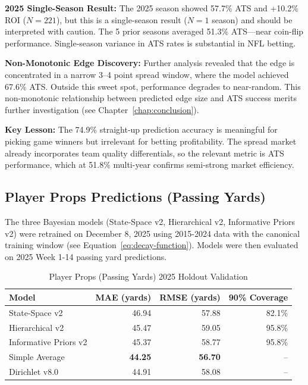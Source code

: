 \textbf{2025 Single-Season Result:} The 2025 season showed 57.7\% ATS and +10.2\% ROI ($N\!=\!221$), but this is a single-season result ($N\!=\!1$ season) and should be interpreted with caution. The 5 prior seasons averaged 51.3\% ATS---near coin-flip performance. Single-season variance in ATS rates is substantial in NFL betting.

\textbf{Non-Monotonic Edge Discovery:} Further analysis revealed that the edge is concentrated in a narrow 3--4 point spread window, where the model achieved 67.6\% ATS. Outside this sweet spot, performance degrades to near-random. This non-monotonic relationship between predicted edge size and ATS success merits further investigation (see Chapter~\ref{chap:conclusion}).

\textbf{Key Lesson:} The 74.9\% straight-up prediction accuracy is meaningful for picking game winners but irrelevant for betting profitability. The spread market already incorporates team quality differentials, so the relevant metric is ATS performance, which at 51.8\% multi-year confirms semi-strong market efficiency.

\subsection{Player Props Predictions (Passing Yards)}

The three Bayesian models (State-Space v2, Hierarchical v2, Informative Priors v2) were retrained on December 8, 2025 using 2015-2024 data with the canonical training window (see Equation~\ref{eq:decay-function}). Models were then evaluated on 2025 Week 1-14 passing yard predictions.

\begin{table}[htbp]
\centering
\caption{Player Props (Passing Yards) 2025 Holdout Validation}
\label{tab:props-holdout-2025}
\begin{tabular}{lrrr}
\toprule
\textbf{Model} & \textbf{MAE (yards)} & \textbf{RMSE (yards)} & \textbf{90\% Coverage} \\
\midrule
State-Space v2 & 46.94 & 57.88 & 82.1\% \\
Hierarchical v2 & 45.47 & 59.05 & 95.8\% \\
Informative Priors v2 & 45.37 & 58.77 & 95.8\% \\
\midrule
Simple Average & \textbf{44.25} & \textbf{56.70} & -- \\
Dirichlet v8.0 & 44.91 & 58.08 & -- \\
\bottomrule
\end{tabular}
\end{table}

